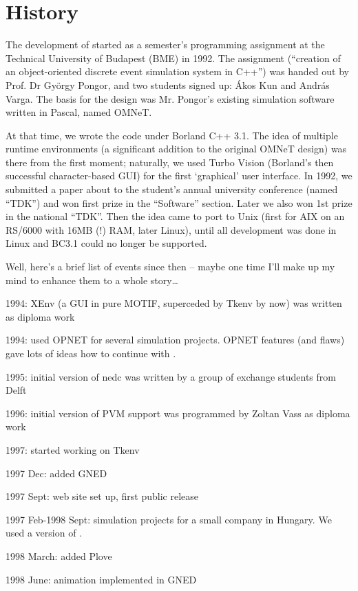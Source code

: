 \section{History}

The development of {\opp} started as a semester's programming
assignment at the Technical University of Budapest (BME) in 1992.
The assignment (``creation of an object-oriented discrete event
simulation system in C++'') was handed out by Prof. Dr Gy\"{o}rgy
Pongor, and two students signed up: \'{A}kos Kun and Andr\'{a}s Varga.
The basis for the design was Mr. Pongor's existing simulation
software written in Pascal, named OMNeT.

At that time, we wrote the code under Borland C++ 3.1. The idea
of multiple runtime environments (a significant addition to the
original OMNeT design) was there from the first moment; naturally,
we used Turbo Vision (Borland's then successful character-based
GUI) for the first `graphical' user interface. In 1992, we submitted
a paper about {\opp} to the student's annual university conference
(named ``TDK'') and won first prize in the ``Software'' section.
Later we also won 1st prize in the national ``TDK''. Then the
idea came to port {\opp} to Unix (first for AIX on an RS/6000
with 16MB (!) RAM, later Linux), until all development was done
in Linux and BC3.1 could no longer be supported.

Well, here's a brief list of events since then -- maybe one time
I'll make up my mind to enhance them to a whole story\dots

1994: XEnv (a GUI in pure MOTIF, superceded by Tkenv by now)
was written as diploma work

1994: used OPNET for several simulation projects. OPNET features
(and flaws) gave lots of ideas how to continue with {\opp}.

1995: initial version of nedc was written by a group of exchange
students from Delft

1996: initial version of PVM support was programmed by Zoltan
Vass as diploma work

1997: started working on Tkenv

1997 Dec: added GNED

1997 Sept: web site set up, first public release

1997 Feb-1998 Sept: simulation projects for a small company in
Hungary. We used a version of {\opp}.

1998 March: added Plove

1998 June: animation implemented in GNED


